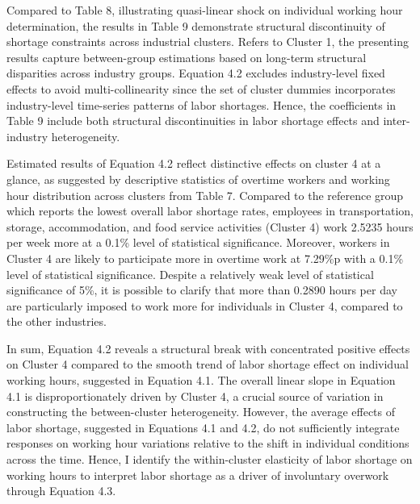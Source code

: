 \documentclass[
  12pt,
]{article}
\begin{document}
Compared to Table 8, illustrating quasi-linear shock on individual
working hour determination, the results in Table 9 demonstrate
structural discontinuity of shortage constraints across industrial
clusters. Refers to Cluster 1, the presenting results capture
between-group estimations based on long-term structural disparities
across industry groups. Equation 4.2 excludes industry-level fixed
effects to avoid multi-collinearity since the set of cluster dummies
incorporates industry-level time-series patterns of labor shortages.
Hence, the coefficients in Table 9 include both structural
discontinuities in labor shortage effects and inter-industry
heterogeneity.

Estimated results of Equation 4.2 reflect distinctive effects on cluster
4 at a glance, as suggested by descriptive statistics of overtime
workers and working hour distribution across clusters from Table 7.
Compared to the reference group which reports the lowest overall labor
shortage rates, employees in transportation, storage, accommodation, and
food service activities (Cluster 4) work 2.5235 hours per week more at a
0.1\% level of statistical significance. Moreover, workers in Cluster 4
are likely to participate more in overtime work at 7.29\%p with a 0.1\%
level of statistical significance. Despite a relatively weak level of
statistical significance of 5\%, it is possible to clarify that more
than 0.2890 hours per day are particularly imposed to work more for
individuals in Cluster 4, compared to the other industries.

In sum, Equation 4.2 reveals a structural break with concentrated
positive effects on Cluster 4 compared to the smooth trend of labor
shortage effect on individual working hours, suggested in Equation 4.1.
The overall linear slope in Equation 4.1 is disproportionately driven by
Cluster 4, a crucial source of variation in constructing the
between-cluster heterogeneity. However, the average effects of labor
shortage, suggested in Equations 4.1 and 4.2, do not sufficiently
integrate responses on working hour variations relative to the shift in
individual conditions across the time. Hence, I identify the
within-cluster elasticity of labor shortage on working hours to
interpret labor shortage as a driver of involuntary overwork through
Equation 4.3.
\end{document}
